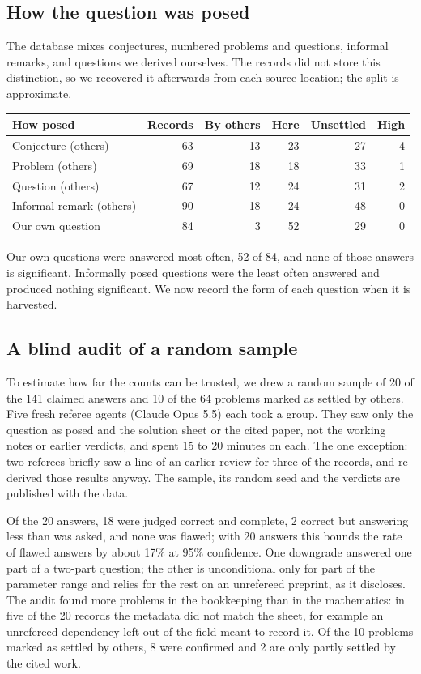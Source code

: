 \documentclass[11pt]{amsart}
\begin{document}
\subsection{How the question was posed}
The database mixes conjectures, numbered problems and questions, informal
remarks, and questions we derived ourselves. The records did not store this
distinction, so we recovered it afterwards from each source location; the split
is approximate.
\begin{center}
  \begin{tabular}{lrrrrr}
    \toprule
    How posed                & Records & By others & Here & Unsettled & High \\
    \midrule
    Conjecture (others)      & 63      & 13        & 23   & 27        & 4    \\
    Problem (others)         & 69      & 18        & 18   & 33        & 1    \\
    Question (others)        & 67      & 12        & 24   & 31        & 2    \\
    Informal remark (others) & 90      & 18        & 24   & 48        & 0    \\
    Our own question         & 84      & 3         & 52   & 29        & 0    \\
    \bottomrule
  \end{tabular}
\end{center}
Our own questions were answered most often, 52 of 84, and none of those answers
is significant. Informally posed questions were the least often answered and
produced nothing significant. We now record the form of each question when it
is harvested.

\subsection{A blind audit of a random sample}\label{sec:audit}
To estimate how far the counts can be trusted, we drew a random sample of 20 of
the 141 claimed answers and 10 of the 64 problems marked as settled by others.
Five fresh referee agents (Claude Opus 5.5) each took a group. They saw only
the question as posed and the solution sheet or the cited paper, not the
working notes or earlier verdicts, and spent 15 to 20 minutes on each. The one
exception: two referees briefly saw a line of an earlier review for three of
the records, and re-derived those results anyway. The sample, its random seed
and the verdicts are published with the data.

Of the 20 answers, 18 were judged correct and complete, 2 correct but answering
less than was asked, and none was flawed; with 20 answers this bounds the rate
of flawed answers by about 17\% at 95\% confidence. One downgrade answered one
part of a two-part question; the other is unconditional only for part of the
parameter range and relies for the rest on an unrefereed preprint, as it
discloses. The audit found more problems in the bookkeeping than in the
mathematics: in five of the 20 records the metadata did not match the sheet,
for example an unrefereed dependency left out of the field meant to record it.
Of the 10 problems marked as settled by others, 8 were confirmed and 2 are only
partly settled by the cited work.
\end{document}
